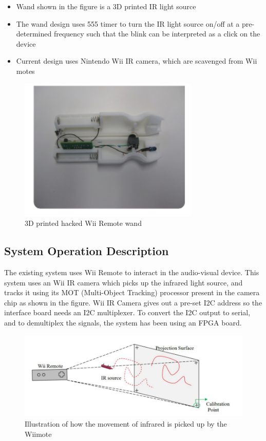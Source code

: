\documentclass[12pt, a4paper]{article}
\begin{document}
\begin{itemize}
\item Wand shown in the figure is a 3D printed IR light source
\item The wand design uses 555 timer to turn the IR light source on/off at a pre-determined frequency such that the blink can be interpreted as a click on the device
\item Current design uses Nintendo Wii IR camera, which are scavenged from Wii motes
\end{itemize}
\begin{figure}[htp]
\centering
\includegraphics[scale=0.4]{wand1.png}
\caption{3D printed hacked Wii Remote wand}
\label{}
\end{figure}


\subsection{System Operation Description}
The existing system uses Wii Remote to interact in the audio-visual device. This system uses an Wii IR camera which picks up the infrared light source, and tracks it using its MOT (Multi-Object Tracking) processor present in the camera chip as shown in the figure. Wii IR Camera gives out a pre-set I2C address so the interface board needs an I2C multiplexer. To convert the I2C output to serial, and to demultiplex the signals, the system has been using an FPGA board. 

\begin{figure}[htp]
\centering
\includegraphics[scale=0.35]{wiiiii.png}
\caption{Illustration of how the movement of infrared is picked up by the Wiimote}
\label{}
\end{figure}
\end{document}
